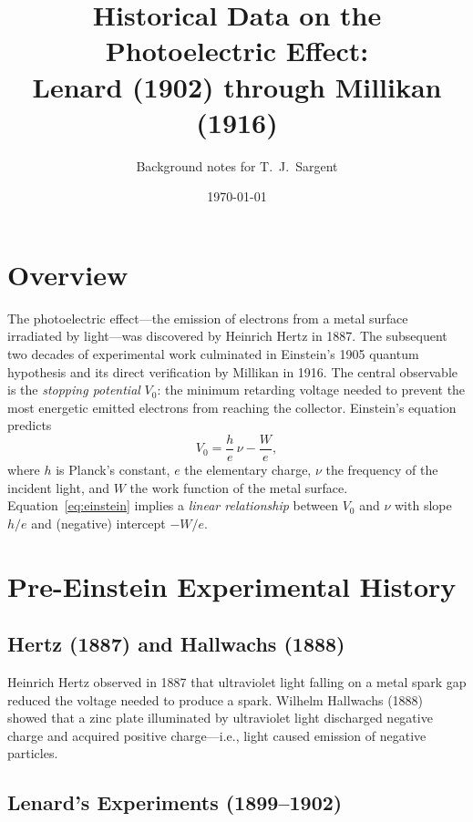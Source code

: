 \documentclass[12pt]{article}
\title{Historical Data on the Photoelectric Effect:\\
Lenard (1902) through Millikan (1916)}
\author{Background notes for T.\ J.\ Sargent}
\date{\today}
\begin{document}
\maketitle
\tableofcontents
\bigskip

\section{Overview}

The photoelectric effect---the emission of electrons from a metal surface
irradiated by light---was discovered by Heinrich Hertz in 1887.  The subsequent
two decades of experimental work culminated in Einstein's 1905 quantum
hypothesis and its direct verification by Millikan in 1916.  The central
observable is the \emph{stopping potential} $V_0$: the minimum retarding voltage
needed to prevent the most energetic emitted electrons from reaching the
collector.  Einstein's equation predicts
\begin{equation}\label{eq:einstein}
  V_0 = \frac{h}{e}\,\nu - \frac{W}{e},
\end{equation}
where $h$ is Planck's constant, $e$ the elementary charge, $\nu$ the frequency
of the incident light, and $W$ the work function of the metal surface.
Equation~\eqref{eq:einstein} implies a \emph{linear relationship} between $V_0$
and $\nu$ with slope $h/e$ and (negative) intercept $-W/e$.

\section{Pre-Einstein Experimental History}

\subsection{Hertz (1887) and Hallwachs (1888)}

Heinrich Hertz observed in 1887 that ultraviolet light falling on a metal spark
gap reduced the voltage needed to produce a spark.  Wilhelm Hallwachs (1888)
showed that a zinc plate illuminated by ultraviolet light discharged negative
charge and acquired positive charge---i.e., light caused emission of negative
particles.

\subsection{Lenard's Experiments (1899--1902)}
\end{document}

